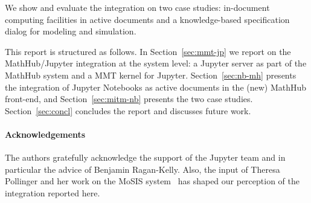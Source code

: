 We show and evaluate the integration on two case studies: in-document computing facilities in active documents and a knowledge-based specification dialog for modeling and simulation. 

This report is structured as follows. In Section~\ref{sec:mmt-jp} we report on the MathHub/Jupyter integration at the system level: a Jupyter server as part of the MathHub system and a MMT kernel for Jupyter. Section~\ref{sec:nb-mh} presents the integration of Jupyter Notebooks as active documents in the (new) MathHub front-end, and Section~\ref{sec:mitm-nb} presents the two case studies. Section~\ref{sec:concl} concludes the report and discusses future work.

\paragraph{Acknowledgements} The authors gratefully acknowledge the support of the Jupyter team and in particular the advice of Benjamin Ragan-Kelly. Also, the input of Theresa Pollinger and her work on the MoSIS system~\cite{PolKohKoe:kacse18} has shaped our perception of the integration reported here. 

